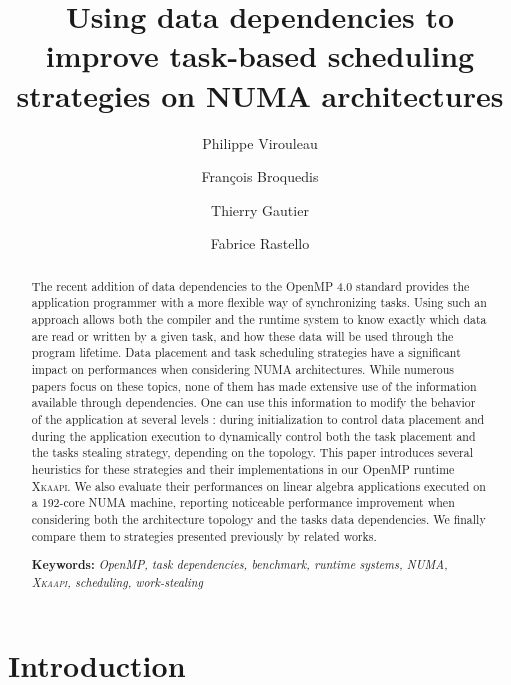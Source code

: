 \documentclass{Styles/llncs}
\newcommand{\kaapi}{\textsc{\mbox{Xkaapi}}\xspace}
\begin{document}
\title{Using data dependencies to improve task-based scheduling strategies on NUMA architectures}
\author{
  Philippe Virouleau \and François Broquedis \and Thierry Gautier \and Fabrice Rastello
 \vspace*{-1ex}}
\date{}
\maketitle

\begin{abstract}
  \vspace*{-5ex} The recent addition of data dependencies to the OpenMP 4.0 standard provides the application programmer with a more flexible way of synchronizing tasks.
  Using such an approach allows both the compiler and the runtime system
  to know exactly which data are read or written by a given task, and how these
  data will be used through the program lifetime.  Data placement and task scheduling
  strategies have a significant impact on performances when considering
  NUMA architectures.  While numerous papers focus on these topics, none of them
  has made extensive use of the information available through dependencies.
  One can use this information to modify the behavior of the application at
  several levels : during initialization to control data placement
  and during the application execution to dynamically control both the
  task placement and the tasks stealing strategy, depending on the topology.
  This paper introduces several heuristics for these strategies and their
  implementations in our OpenMP runtime \kaapi.
  We also evaluate their performances on linear algebra
  applications executed on a 192-core NUMA machine, reporting noticeable performance improvement when considering both the architecture topology and the tasks data dependencies.
   We finally
  compare them to strategies presented previously by related works.

\smallskip
  \noindent\textbf{Keywords:}
  \emph{
    OpenMP, task dependencies, benchmark, runtime systems, NUMA, \kaapi, scheduling, work-stealing
  }
\end{abstract}


\section{Introduction}
\end{document}
